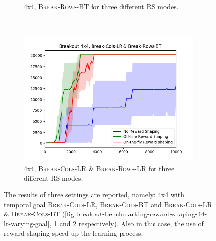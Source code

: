 \begin{figure}[h]
\begin{subfigure}[b]{0.57\textwidth}
	 	\caption{\Breakout 4x4, \textsc{Break-Rows-BT} for three different RS modes.}
		\label{fig:breakout-benchmarking-reward-shaping-44-bt-varying-goal}
	\end{subfigure}
	~ %
	\begin{subfigure}[b]{0.57\textwidth}
		\includegraphics[width=\textwidth]{images/b44-both-comparison}
		\caption{\Breakout 4x4, \textsc{Break-Cols-LR \& Break-Rows-LR} for three different RS modes.}
		\label{fig:breakout-benchmarking-reward-shaping-44-lr-bt-varying-goal}
	\end{subfigure}
	\caption{The results of three settings are reported, namely: \Breakout 4x4 with temporal goal \textsc{Break-Cols-LR}, \textsc{Break-Cols-BT} and \textsc{Break-Cols-LR \& \textsc{Break-Cols-BT}} (\ref{fig:breakout-benchmarking-reward-shaping-44-lr-varying-goal}, \ref{fig:breakout-benchmarking-reward-shaping-44-bt-varying-goal} and  \ref{fig:breakout-benchmarking-reward-shaping-44-lr-bt-varying-goal} respectively). Also in this case, the use of reward shaping speed-up the learning process. }\label{fig:breakout-benchmarking-reward-shaping-44-different-goal}
\end{figure}
\clearpage

